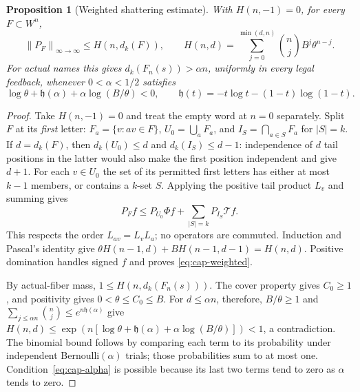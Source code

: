 \documentclass[11pt,reqno]{amsart}
\numberwithin{equation}{section}
\newtheorem{proposition}[theorem]{Proposition}
\theoremstyle{definition}
\newcommand{\opnorm}[1]{\left\|#1\right\|_{\infty\to\infty}}
\begin{document}
\begin{proposition}[Weighted shattering estimate]\label{prop:weighted-sauer}
With $H(n,-1)=0$, for every $F\subset W^n$,
\begin{equation}\label{eq:cap-weighted}
 \opnorm{P_F}\le
 H(n,d_k(F)),\qquad
 H(n,d)=\sum_{j=0}^{\min(d,n)}\binom nj B^j\theta^{n-j}.
\end{equation}
For actual names this gives $d_k(F_n(s))>\alpha n$, uniformly in
every legal feedback, whenever $0<\alpha<1/2$ satisfies
\begin{equation}\label{eq:cap-alpha}
 \log\theta+\mathfrak h(\alpha)+\alpha\log(B/\theta)<0,
 \qquad\mathfrak h(t)=-t\log t-(1-t)\log(1-t).
\end{equation}
\end{proposition}
\begin{proof}
Take $H(n,-1)=0$ and treat the empty word at $n=0$ separately.
Split $F$ at its \emph{first} letter: $F_a=\{v:av\in F\}$,
$U_0=\bigcup_aF_a$, and $I_S=\bigcap_{a\in S}F_a$ for
$|S|=k$. If $d=d_k(F)$, then $d_k(U_0)\le d$ and
$d_k(I_S)\le d-1$: independence of $d$ tail positions in the latter
would also make the first position independent and give $d+1$.
For each $v\in U_0$ the set of its permitted first letters has
either at most $k-1$ members, or contains a $k$-set $S$. Applying
the positive tail product $L_v$ and summing gives
\[
 P_F f\le P_{U_0}\Phi f+\sum_{|S|=k}P_{I_S}\mathcal T f.
\]
This respects the order $L_{av}=L_vL_a$; no operators are
commuted. Induction and Pascal's identity give
$\theta H(n-1,d)+BH(n-1,d-1)=H(n,d)$. Positive domination
handles signed $f$ and proves \eqref{eq:cap-weighted}.

By actual-fiber mass, $1\le H(n,d_k(F_n(s)))$.
The cover property gives $C_0\ge1$, and positivity gives
$0<\theta\le C_0\le B$. For $d\le\alpha n$, therefore,
$B/\theta\ge1$ and
$\sum_{j\le\alpha n}\binom nj\le e^{n\mathfrak h(\alpha)}$
give
$H(n,d)\le\exp(n[\log\theta+\mathfrak h(\alpha)+
\alpha\log(B/\theta)])<1$, a contradiction.
The binomial bound follows by comparing each term to its probability
under independent Bernoulli$(\alpha)$ trials; those probabilities
sum to at most one. Condition~\eqref{eq:cap-alpha} is possible
because its last two terms tend to zero as $\alpha$ tends to zero.
\end{proof}
\end{document}
